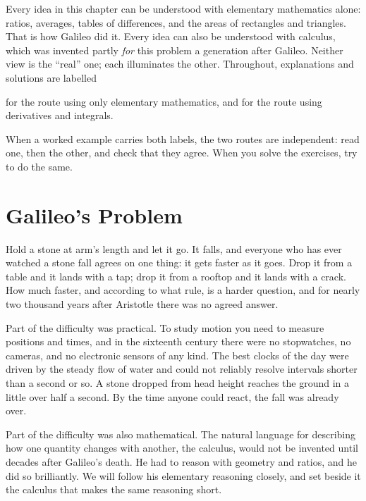 \documentclass[11pt,twoside,openany]{book}
\newcounter{check}[chapter]
\newcommand{\viewtag}[3]{\fcolorbox{#2}{#3}{\footnotesize\textbf{\textcolor{#2}{#1}}}}
\newcommand{\elemtag}{\viewtag{Elementary}{elemcol}{elempale}}
\newcommand{\calctag}{\viewtag{Calculus}{calccol}{calcpale}}
\begin{document}
\begin{tcolorbox}[enhanced,colback=slatepale,colframe=slate,sharp corners,boxrule=0.6pt,
  title=\textbf{How to read this chapter: two perspectives},coltitle=white,colbacktitle=slate,left=3mm,right=3mm]
Every idea in this chapter can be understood with elementary mathematics alone: ratios, averages, tables of differences, and the areas of rectangles and triangles. That is how Galileo did it. Every idea can also be understood with calculus, which was invented partly \emph{for} this problem a generation after Galileo. Neither view is the ``real'' one; each illuminates the other. Throughout, explanations and solutions are labelled
\begin{center}
\elemtag\quad for the route using only elementary mathematics, and \qquad \calctag\quad for the route using derivatives and integrals.
\end{center}
When a worked example carries both labels, the two routes are independent: read one, then the other, and check that they agree. When you solve the exercises, try to do the same.
\end{tcolorbox}

\section{Galileo's Problem}

Hold a stone at arm's length and let it go. It falls, and everyone who has ever watched a stone fall agrees on one thing: it gets faster as it goes. Drop it from a table and it lands with a tap; drop it from a rooftop and it lands with a crack. How much faster, and according to what rule, is a harder question, and for nearly two thousand years after Aristotle there was no agreed answer.

Part of the difficulty was practical. To study motion you need to measure positions and times, and in the sixteenth century there were no stopwatches, no cameras, and no electronic sensors of any kind. The best clocks of the day were driven by the steady flow of water and could not reliably resolve intervals shorter than a second or so. A stone dropped from head height reaches the ground in a little over half a second. By the time anyone could react, the fall was already over.

Part of the difficulty was also mathematical. The natural language for describing how one quantity changes with another, the calculus, would not be invented until decades after Galileo's death. He had to reason with geometry and ratios, and he did so brilliantly. We will follow his elementary reasoning closely, and set beside it the calculus that makes the same reasoning short.
\end{document}
